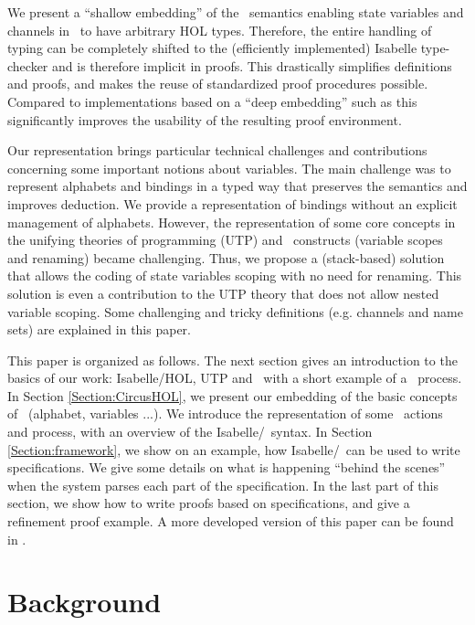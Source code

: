 \documentclass[11pt,a4paper]{article}
\begin{document}
We present a ``shallow embedding'' of the \Circus\
semantics enabling state variables and channels in \Circus\ to have
arbitrary HOL types. Therefore, the entire handling of typing can be
completely shifted to the (efficiently implemented) Isabelle
type-checker and is therefore implicit in proofs. This drastically
simplifies definitions and proofs, and makes the reuse of
standardized proof procedures possible. Compared to implementations
based on a ``deep embedding'' such as \cite{ZC09} this significantly improves the
usability of the resulting proof environment.

Our representation brings particular technical challenges and contributions concerning
some important notions about variables. The main challenge was to represent alphabets 
and bindings in a typed way that preserves the semantics and improves deduction. 
We provide 
a representation of bindings without an explicit management of alphabets. 
However, the 
representation of some core concepts in the
unifying theories of programming (UTP) and \Circus\ constructs (variable scopes and renaming) became 
challenging. 
Thus, we propose a (stack-based) solution that allows the coding of state variables 
scoping with no need for renaming. This solution is even a contribution to the UTP theory that 
does not allow nested variable scoping. Some challenging and tricky definitions (e.g. channels 
and name sets) are explained in this paper.

This paper is organized as follows. The next section gives an introduction to the basics of our 
work: Isabelle/HOL, UTP and \Circus\ with a short example of a \Circus\ process. In Section \ref{Section:CircusHOL}, 
we present our embedding of the basic concepts of  \Circus\  (alphabet, variables ...). We introduce the representation of  some \Circus\ actions and process, with an overview of the Isabelle/\Circus\ syntax. In 
Section \ref{Section:framework}, we show on an example, how  Isabelle/\Circus\  can be used to write specifications. 
We give some details on what %
is happening ``behind the scenes'' when the system parses each part of the specification. In the last part of 
this section, we show how to write proofs based on specifications, and give a refinement proof example.
A more developed version of this paper can be found in \cite{fgw11rapport-lri}.
 

\section{Background}
\label{Section:background}
\end{document}
